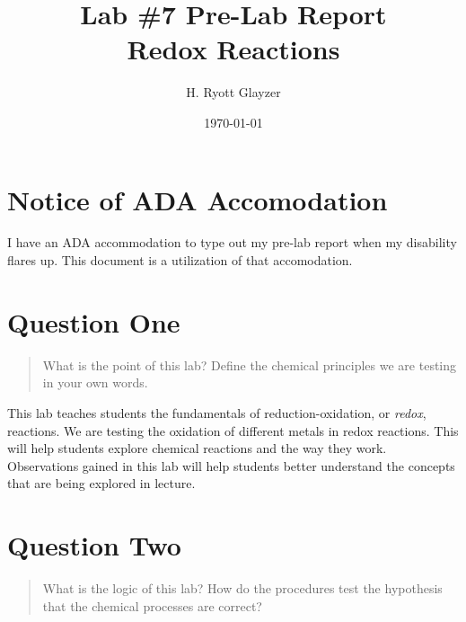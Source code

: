 \documentclass[11pt, letterpaper]{article}
\begin{document}


\title{Lab \#7 Pre-Lab Report \\ \large Redox Reactions}
\author{H. Ryott Glayzer}
\date{\today}


\maketitle


\section*{Notice of ADA Accomodation}
I have an ADA accommodation to type out my pre-lab report when my disability flares up.
This document is a utilization of that accomodation.

\section{Question One}
\begin{quote}
    What is the point of this lab? Define the chemical principles we are testing in your own words.
\end{quote}
This lab teaches students the fundamentals of reduction-oxidation, or \textit{redox}, reactions.
We are testing the oxidation of different metals in redox reactions.
This will help students explore chemical reactions and the way they work.
Observations gained in this lab will help students better understand the concepts
that are being explored in lecture.





\section{Question Two}
\begin{quote}
    What is the logic of this lab? How do the procedures test the hypothesis that the chemical 
    processes are correct?
\end{quote}
\end{document}
